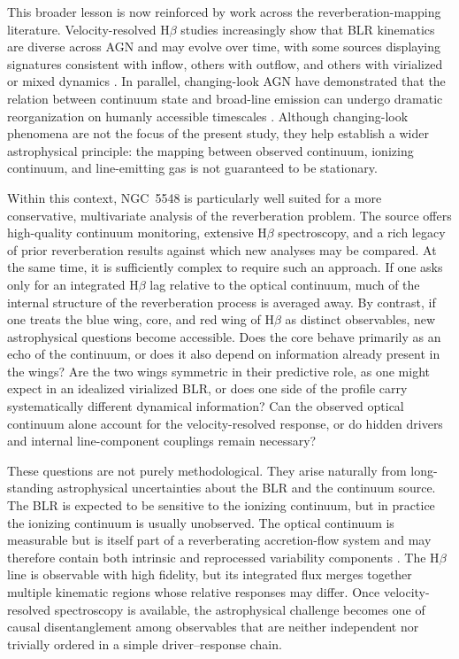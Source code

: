 \documentclass[12pt, a4paper]{article}
\begin{document}
This broader lesson is now reinforced by work across the reverberation-mapping literature. Velocity-resolved H$\beta$ studies increasingly show that BLR kinematics are diverse across AGN and may evolve over time, with some sources displaying signatures consistent with inflow, others with outflow, and others with virialized or mixed dynamics \cite{Du2018,Wang2025,Feng2024}. In parallel, changing-look AGN have demonstrated that the relation between continuum state and broad-line emission can undergo dramatic reorganization on humanly accessible timescales \cite{RicciTrakhtenbrot2023}. Although changing-look phenomena are not the focus of the present study, they help establish a wider astrophysical principle: the mapping between observed continuum, ionizing continuum, and line-emitting gas is not guaranteed to be stationary.

Within this context, NGC~5548 is particularly well suited for a more conservative, multivariate analysis of the reverberation problem. The source offers high-quality continuum monitoring, extensive H$\beta$ spectroscopy, and a rich legacy of prior reverberation results against which new analyses may be compared. At the same time, it is sufficiently complex to require such an approach. If one asks only for an integrated H$\beta$ lag relative to the optical continuum, much of the internal structure of the reverberation process is averaged away. By contrast, if one treats the blue wing, core, and red wing of H$\beta$ as distinct observables, new astrophysical questions become accessible. Does the core behave primarily as an echo of the continuum, or does it also depend on information already present in the wings? Are the two wings symmetric in their predictive role, as one might expect in an idealized virialized BLR, or does one side of the profile carry systematically different dynamical information? Can the observed optical continuum alone account for the velocity-resolved response, or do hidden drivers and internal line-component couplings remain necessary?

These questions are not purely methodological. They arise naturally from long-standing astrophysical uncertainties about the BLR and the continuum source. The BLR is expected to be sensitive to the ionizing continuum, but in practice the ionizing continuum is usually unobserved. The optical continuum is measurable but is itself part of a reverberating accretion-flow system and may therefore contain both intrinsic and reprocessed variability components \cite{Fausnaugh2017,Cackett2021}. The H$\beta$ line is observable with high fidelity, but its integrated flux merges together multiple kinematic regions whose relative responses may differ. Once velocity-resolved spectroscopy is available, the astrophysical challenge becomes one of causal disentanglement among observables that are neither independent nor trivially ordered in a simple driver--response chain.
\end{document}
